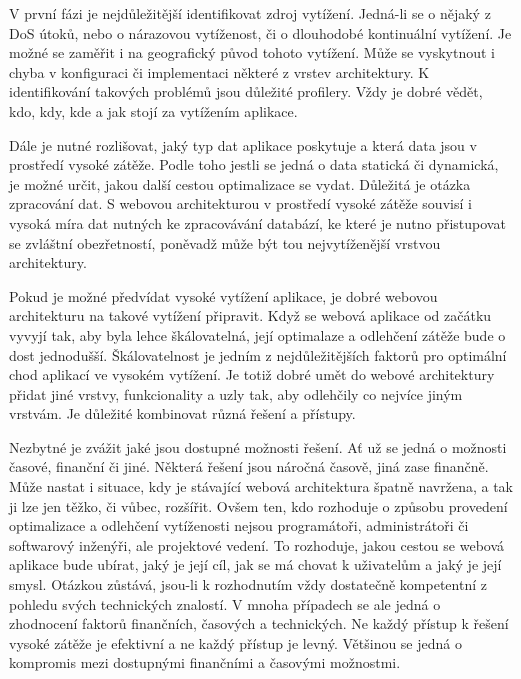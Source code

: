\documentclass[12pt]{article}
\begin{document}
V první fázi je nejdůležitější identifikovat zdroj vytížení. Jedná-li se o nějaký z DoS útoků, nebo o nárazovou vytíženost, či o dlouhodobé kontinuální vytížení. Je možné se zaměřit i na geografický původ tohoto vytížení. Může se vyskytnout i chyba v konfiguraci či implementaci některé z vrstev architektury. K identifikování takových problémů jsou důležité profilery. Vždy je dobré vědět, kdo, kdy, kde a jak stojí za vytížením aplikace.

Dále je nutné rozlišovat, jaký typ dat aplikace poskytuje a která data jsou v prostředí vysoké zátěže. Podle toho jestli se jedná o data statická či dynamická, je možné určit, jakou další cestou optimalizace se vydat. Důležitá je otázka zpracování dat. S webovou architekturou v prostředí vysoké zátěže souvisí i vysoká míra dat nutných ke zpracovávání databází, ke které je nutno přistupovat se zvláštní obezřetností, poněvadž může být tou nejvytíženější vrstvou architektury.

Pokud je možné předvídat vysoké vytížení aplikace, je dobré webovou architekturu na takové vytížení připravit. Když se webová aplikace od začátku vyvyjí tak, aby byla lehce škálovatelná, její optimalaze a odlehčení zátěže bude o dost jednodušší. Škálovatelnost je jedním z nejdůležitějších faktorů pro optimální chod aplikací ve vysokém vytížení. Je totiž dobré umět do webové architektury přidat jiné vrstvy, funkcionality a uzly tak, aby odlehčily co nejvíce jiným vrstvám. Je důležité kombinovat různá řešení a přístupy.

Nezbytné je zvážit jaké jsou dostupné možnosti řešení. Ať už se jedná o možnosti časové, finanční či jiné. Některá řešení jsou náročná časově, jiná zase finančně. Může nastat i situace, kdy je stávající webová architektura špatně navržena, a tak ji lze jen těžko, či vůbec, rozšířit. Ovšem ten, kdo rozhoduje o způsobu provedení optimalizace a odlehčení vytíženosti nejsou programátoři, administrátoři či softwarový inženýři, ale projektové vedení. To rozhoduje, jakou cestou se webová aplikace bude ubírat, jaký je její cíl, jak se má chovat k uživatelům a jaký je její smysl. Otázkou zůstává, jsou-li k rozhodnutím vždy dostatečně kompetentní z pohledu svých technických znalostí. V mnoha případech se ale jedná o zhodnocení faktorů finančních, časových a technických. Ne každý přístup k řešení vysoké zátěže je efektivní a ne každý přístup je levný. Většinou se jedná o kompromis mezi dostupnými finančními a časovými možnostmi.
\end{document}
